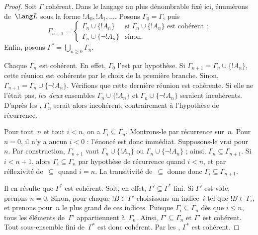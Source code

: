 \documentclass[../../../include/open-logic-section]{subfiles}
\begin{document}
\begin{proof}
Soit $\Gamma$ cohérent. Dans le langage au plus dénombrable fixé ici,
énumérons  de~$\Lang L$ sous la forme
$!A_0,!A_1,\dots{}$. Posons $\Gamma_0=\Gamma$, puis
\[
\Gamma_{n+1} =
\begin{cases}
\Gamma_n \cup \{ !A_n \} & \textrm{si $\Gamma_n \cup \{!A_n\}$ est
  cohérent ;} \\
\Gamma_n \cup \{ \lnot !A_n \} & \textrm{sinon.}
\end{cases}
\]
Enfin, posons $\Gamma^*=\bigcup_{n\geq 0}\Gamma_n$.

Chaque $\Gamma_n$ est cohérent. En effet, $\Gamma_0$ l'est par
hypothèse. Si $\Gamma_{n+1}=\Gamma_n\cup\{!A_n\}$, cette réunion
est cohérente par le choix de la première branche. Sinon,
$\Gamma_{n+1}=\Gamma_n\cup\{\lnot !A_n\}$. Vérifions que cette
dernière réunion est cohérente. Si elle ne l'était pas,
\emph{les deux} ensembles $\Gamma_n\cup\{!A_n\}$ et
$\Gamma_n\cup\{\lnot !A_n\}$ seraient incohérents.
D'après les
,
$\Gamma_n$ serait alors incohérent, contrairement à l'hypothèse de
récurrence.

Pour tout~$n$ et tout $i<n$, on a $\Gamma_i\subseteq\Gamma_n$.
Montrons-le par récurrence sur~$n$. Pour $n=0$, il n'y a aucun
$i<0$ : l'énoncé est donc immédiat. Supposons-le vrai pour~$n$.
Par construction, $\Gamma_{n+1}$ vaut
$\Gamma_n\cup\{!A_n\}$ ou
$\Gamma_n\cup\{\lnot !A_n\}$ ; ainsi,
$\Gamma_n\subseteq\Gamma_{n+1}$. Si $i<n+1$, alors
$\Gamma_i\subseteq\Gamma_n$ par hypothèse de récurrence quand
$i<n$, et par réflexivité de~$\subseteq$ quand $i=n$.
La transitivité de~$\subseteq$ donne donc
$\Gamma_i\subseteq\Gamma_{n+1}$.

Il en résulte que $\Gamma^*$ est cohérent. Soit, en effet,
$\Gamma'\subseteq\Gamma^*$ fini. Si $\Gamma'$ est vide, prenons
$n=0$. Sinon, pour chaque $!B\in\Gamma'$ choisissons un indice~$i$
tel que $!B\in\Gamma_i$, et prenons pour~$n$ le plus grand de ces
indices. Puisque $\Gamma_i\subseteq\Gamma_n$ dès que $i\le n$,
tous les éléments de~$\Gamma'$ appartiennent à~$\Gamma_n$.
Ainsi, $\Gamma'\subseteq\Gamma_n$ et $\Gamma'$ est cohérent.
Tout sous-ensemble fini de~$\Gamma^*$ est donc cohérent. Par les
,
$\Gamma^*$ est cohérent.


\end{proof}
\end{document}
